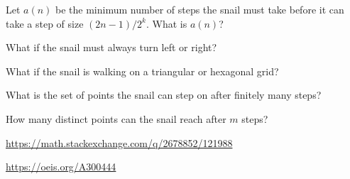 \documentclass{article}
\begin{document}
\begin{question}
  Let $a(n)$ be the minimum number of steps the snail must take before it can
  take a step of size $(2n-1)/2^k$. What is $a(n)$?
\end{question}
\begin{related}
  \item What if the snail must always turn left or right?
  \item What if the snail is walking on a triangular or hexagonal grid?
  \item What is the set of points the snail can step on after finitely many steps?
  \item How many distinct points can the snail reach after $m$ steps?
\end{related}
\begin{references}
  \item \url{https://math.stackexchange.com/q/2678852/121988}
  \item \url{https://oeis.org/A300444}
\end{references}
\end{document}
